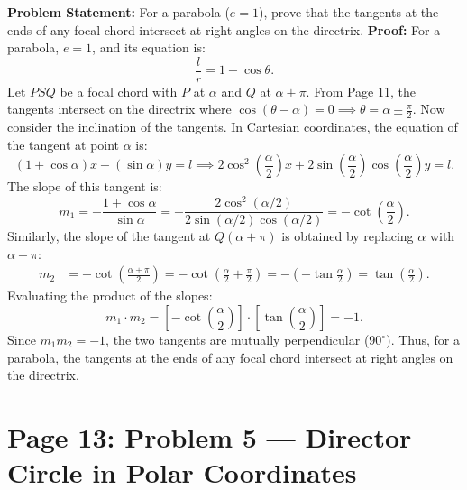 \begin{examplebox}
\textbf{Problem Statement:}
For a parabola ($e = 1$), prove that the tangents at the ends of any focal chord intersect at right angles on the directrix.
\tcblower
\textbf{Proof:}
For a parabola, $e = 1$, and its equation is:
\begin{equation}
    \frac{l}{r} = 1 + \cos\theta.
\end{equation}
Let $PSQ$ be a focal chord with $P$ at $\alpha$ and $Q$ at $\alpha + \pi$.
From Page 11, the tangents intersect on the directrix where $\cos(\theta - \alpha) = 0 \implies \theta = \alpha \pm \frac{\pi}{2}$.
Now consider the inclination of the tangents.
In Cartesian coordinates, the equation of the tangent at point $\alpha$ is:
\begin{equation}
    (1 + \cos\alpha)x + (\sin\alpha)y = l \implies 2\cos^2\left(\frac{\alpha}{2}\right)x + 2\sin\left(\frac{\alpha}{2}\right)\cos\left(\frac{\alpha}{2}\right)y = l.
\end{equation}
The slope of this tangent is:
\begin{equation}
    m_1 = -\frac{1 + \cos\alpha}{\sin\alpha} = -\frac{2\cos^2(\alpha/2)}{2\sin(\alpha/2)\cos(\alpha/2)} = -\cot\left(\frac{\alpha}{2}\right).
\end{equation}
Similarly, the slope of the tangent at $Q(\alpha + \pi)$ is obtained by replacing $\alpha$ with $\alpha + \pi$:
\begin{align}
    m_2 &= -\cot\left(\frac{\alpha + \pi}{2}\right) = -\cot\left(\frac{\alpha}{2} + \frac{\pi}{2}\right) = - \left(-\tan\frac{\alpha}{2}\right) = \tan\left(\frac{\alpha}{2}\right).
\end{align}
Evaluating the product of the slopes:
\begin{equation}
    m_1 \cdot m_2 = \left[-\cot\left(\frac{\alpha}{2}\right)\right] \cdot \left[\tan\left(\frac{\alpha}{2}\right)\right] = -1.
\end{equation}
Since $m_1 m_2 = -1$, the two tangents are mutually perpendicular ($90^\circ$).
Thus, for a parabola, the tangents at the ends of any focal chord intersect at right angles on the directrix.
\end{examplebox}

\newpage
\section{Page 13: Problem 5 --- Director Circle in Polar Coordinates}
\label{sec:page13}

